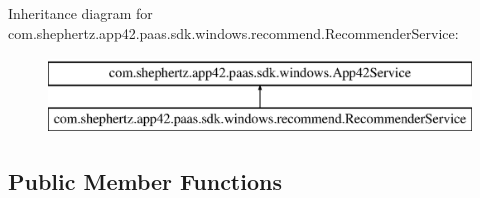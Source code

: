 Inheritance diagram for com.\+shephertz.\+app42.\+paas.\+sdk.\+windows.\+recommend.\+Recommender\+Service\+:\begin{figure}[H]
\begin{center}
\leavevmode
\includegraphics[height=2.000000cm]{classcom_1_1shephertz_1_1app42_1_1paas_1_1sdk_1_1windows_1_1recommend_1_1_recommender_service}
\end{center}
\end{figure}
\subsection*{Public Member Functions}
